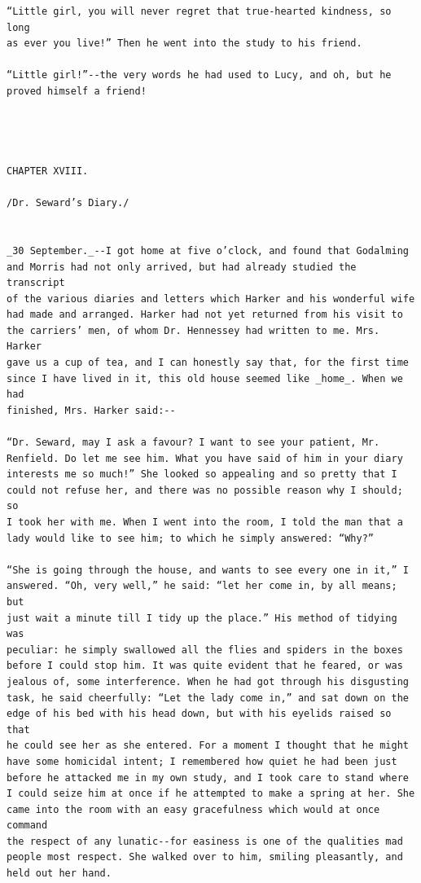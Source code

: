 \documentclass{article}
\begin{document}
\begin{verbatim}
“Little girl, you will never regret that true-hearted kindness, so long
as ever you live!” Then he went into the study to his friend.

“Little girl!”--the very words he had used to Lucy, and oh, but he
proved himself a friend!




CHAPTER XVIII.

/Dr. Seward’s Diary./


_30 September._--I got home at five o’clock, and found that Godalming
and Morris had not only arrived, but had already studied the transcript
of the various diaries and letters which Harker and his wonderful wife
had made and arranged. Harker had not yet returned from his visit to
the carriers’ men, of whom Dr. Hennessey had written to me. Mrs. Harker
gave us a cup of tea, and I can honestly say that, for the first time
since I have lived in it, this old house seemed like _home_. When we had
finished, Mrs. Harker said:--

“Dr. Seward, may I ask a favour? I want to see your patient, Mr.
Renfield. Do let me see him. What you have said of him in your diary
interests me so much!” She looked so appealing and so pretty that I
could not refuse her, and there was no possible reason why I should; so
I took her with me. When I went into the room, I told the man that a
lady would like to see him; to which he simply answered: “Why?”

“She is going through the house, and wants to see every one in it,” I
answered. “Oh, very well,” he said: “let her come in, by all means; but
just wait a minute till I tidy up the place.” His method of tidying was
peculiar: he simply swallowed all the flies and spiders in the boxes
before I could stop him. It was quite evident that he feared, or was
jealous of, some interference. When he had got through his disgusting
task, he said cheerfully: “Let the lady come in,” and sat down on the
edge of his bed with his head down, but with his eyelids raised so that
he could see her as she entered. For a moment I thought that he might
have some homicidal intent; I remembered how quiet he had been just
before he attacked me in my own study, and I took care to stand where
I could seize him at once if he attempted to make a spring at her. She
came into the room with an easy gracefulness which would at once command
the respect of any lunatic--for easiness is one of the qualities mad
people most respect. She walked over to him, smiling pleasantly, and
held out her hand.


\end{verbatim}
\end{document}
